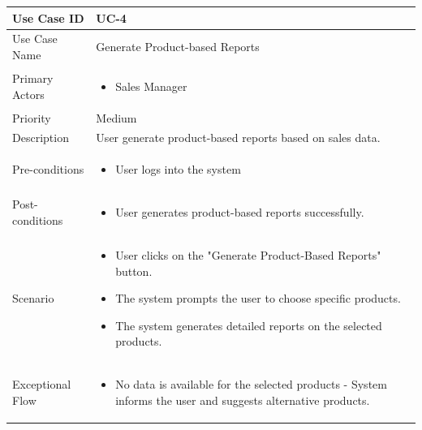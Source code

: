 \begin{tabularx}{\textwidth}{|l|X|}
\hline
Use Case ID & UC-4 \\
\hline
Use Case Name & Generate Product-based Reports\\
\hline
Primary Actors & 
\begin{itemize}
    \item Sales Manager
\end{itemize} \\
\hline
Priority & Medium \\
\hline
Description & User generate product-based reports based on sales data. \\
\hline
Pre-conditions & 
\begin{itemize}    
    \item User logs into the system
\end{itemize} \\
\hline
Post-conditions & 
\begin{itemize}
    \item User generates product-based reports successfully.
\end{itemize} \\
\hline
Scenario & 
\begin{itemize}
    \item User clicks on the "Generate Product-Based Reports" button. 
    \item The system prompts the user to choose specific products.
    \item The system generates detailed reports on the selected products.
\end{itemize}\\
\hline
Exceptional Flow & 
\begin{itemize}
    \item No data is available for the selected products - System informs the user and suggests alternative products. 
\end{itemize}\\
\hline
\end{tabularx}

\vspace{12pt}

